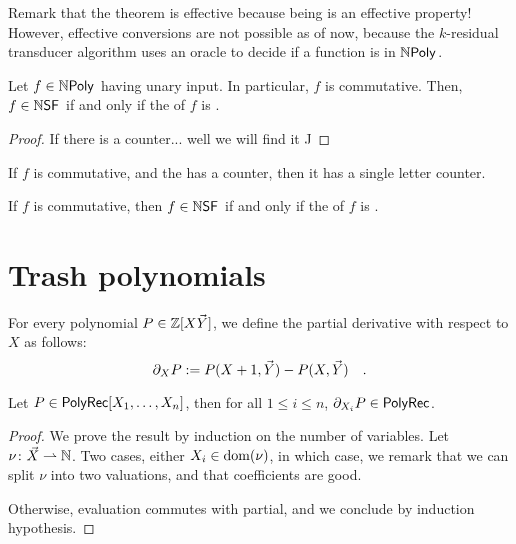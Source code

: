 Remark that the theorem is effective because being 
is an effective property! However, effective conversions are not possible as of
now, because the $k$-residual transducer algorithm uses an oracle to decide if
a function is in $\NPoly$.


\begin{lemma}
    \label{trivial-for-unary:lemma}
    Let $f \in \NPoly$ having unary input.
    In particular, $f$ is commutative.
    Then, $f \in \NSF$ if and only if 
    the  of $f$
    is .
\end{lemma}
\begin{proof}
    If there is a counter... well we will find it ^^
\end{proof}

\begin{conjecture}
    If $f$ is commutative, and the 
    has a counter, then it has a single letter counter.
\end{conjecture}

\begin{conjecture}
    If $f$ is commutative, then 
    $f \in \NSF$ if and only if the 
    of $f$ is .
\end{conjecture}

\section{Trash polynomials}

\begin{definition}
    For every polynomial $P \in \mathbb{Z}[X \vec{Y}]$, we define 
    the partial derivative with respect to $X$ as follows:
    \begin{equation*}
        \partial_X P \mathrel{:=} P(X + 1, \vec{Y}) - P(X, \vec{Y}) \quad .
    \end{equation*}
\end{definition}

\begin{fact}
    Let $P \in \mathsf{PolyRec}[X_1, \dots, X_n]$, then
    for all $1 \leq i \leq n$,
    $\partial_{X_i} P \in \mathsf{PolyRec}$.
\end{fact}
\begin{proof}
    We prove the result by induction on the number of variables.
    Let $\nu \colon \vec{X} \rightharpoonup \mathbb{N}$.
    Two cases, either $X_i \in \operatorname{dom}(\nu)$,
    in which case, we remark that
    we can split $\nu$ into two valuations,
    and that coefficients are good.

    Otherwise, evaluation commutes with partial,
    and we conclude by induction hypothesis.
\end{proof}

